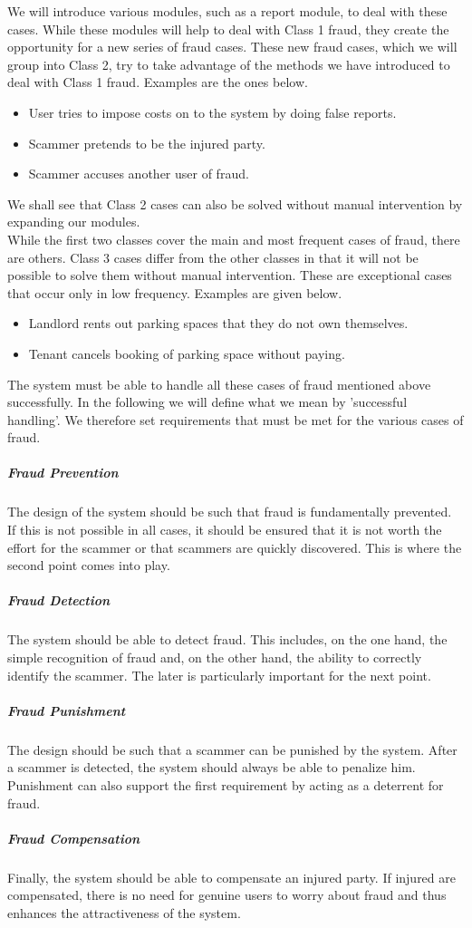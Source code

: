 \documentclass[
a4paper,     %
titlepage,   %
14pt         %
]{scrartcl}  %
\theoremstyle{mystyle}
\begin{document}
We will introduce various modules, such as a report module, to deal with these cases. While these modules will help to deal with Class 1 fraud, they create the opportunity for a new series of fraud cases. These new fraud cases, which we will group into Class 2, try to take advantage of the methods we have introduced to deal with Class 1 fraud. Examples are the ones below.
\begin{itemize}
\item User tries to impose costs on to the system by doing false reports.
\item Scammer pretends to be the injured party.
\item Scammer accuses another user of fraud.
\end{itemize}
We shall see that Class 2 cases can also be solved without manual intervention by expanding our modules. \\

While the first two classes cover the main and most frequent cases of fraud, there are others. Class 3 cases differ from the other classes in that it will not be possible to solve them without manual intervention. These are exceptional cases that occur only in low frequency. Examples are given below.
\begin{itemize}
\item Landlord rents out parking spaces that they do not own themselves.
\item Tenant cancels booking of parking space without paying.
\end{itemize}

The system must be able to handle all these cases of fraud mentioned above successfully. In the following we will define what we mean by 'successful handling'. We therefore set requirements that must be met for the various cases of fraud.
\subparagraph{Fraud Prevention} The design of the system should be such that fraud is fundamentally prevented. If this is not possible in all cases, it should be ensured that it is not worth the effort for the scammer or that scammers are quickly discovered. This is where the second point comes into play.
\subparagraph{Fraud Detection} The system should be able to detect fraud. This includes, on the one hand, the simple recognition of fraud and, on the other hand, the ability to correctly identify the scammer. The later is particularly important for the next point.
\subparagraph{Fraud Punishment} The design should be such that a scammer can be punished by the system. After a scammer is detected, the system should always be able to penalize him. Punishment can also support the first requirement by acting as a deterrent for fraud.
\subparagraph{Fraud Compensation} Finally, the system should be able to compensate an injured party. If injured are compensated, there is no need for genuine users to worry about fraud and thus enhances the attractiveness of the system.\\
\end{document}
